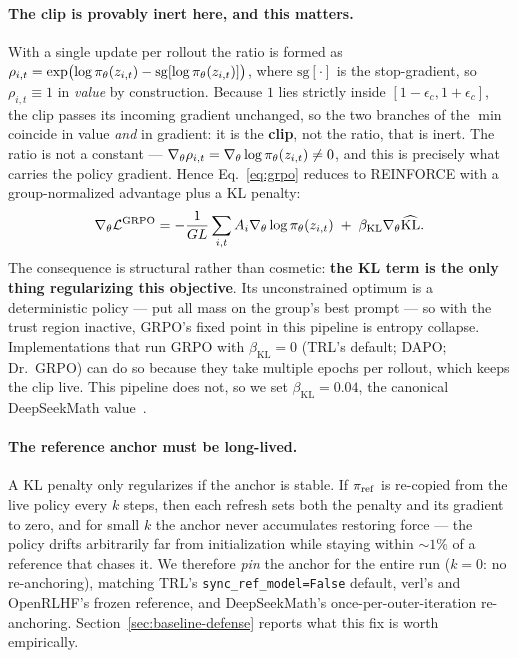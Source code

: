 \paragraph{The clip is provably inert here, and this matters.}
With a single update per rollout the ratio is formed as
$\rho_{i,t} = \exp\bigl(\log \pi_\theta(z_{i,t}) - \mathrm{sg}[\log \pi_\theta(z_{i,t})]\bigr)$,
where $\mathrm{sg}[\cdot]$ is the stop-gradient, so $\rho_{i,t} \equiv 1$ in
\emph{value} by construction. Because $1$ lies strictly inside
$[1-\epsilon_c, 1+\epsilon_c]$, the clip passes its incoming gradient
unchanged, so the two branches of the $\min$ coincide in value \emph{and} in
gradient: it is the \textbf{clip}, not the ratio, that is inert. The ratio is
not a constant --- $\nabla_\theta \rho_{i,t} = \nabla_\theta \log \pi_\theta(z_{i,t})
\neq 0$, and this is precisely what carries the policy gradient. Hence
Eq.~\eqref{eq:grpo} reduces to REINFORCE with a group-normalized advantage plus
a KL penalty:
\begin{equation}
  \nabla_\theta \mathcal{L}^{\mathrm{GRPO}}
  = -\frac{1}{G L}\sum_{i,t} A_i \nabla_\theta \log \pi_\theta(z_{i,t})
    \;+\; \beta_{\mathrm{KL}} \nabla_\theta \widehat{\mathrm{KL}} .
\end{equation}
The consequence is structural rather than cosmetic: \textbf{the KL term is the
only thing regularizing this objective}. Its unconstrained optimum is a
deterministic policy --- put all mass on the group's best prompt --- so with the
trust region inactive, GRPO's fixed point in this pipeline is entropy collapse.
Implementations that run GRPO with $\beta_{\mathrm{KL}} = 0$ (TRL's default;
DAPO; Dr.\ GRPO) can do so because they take multiple epochs per rollout, which
keeps the clip live. This pipeline does not, so we set
$\beta_{\mathrm{KL}} = 0.04$, the canonical DeepSeekMath value~\citep{shao2024deepseekmath}.

\paragraph{The reference anchor must be long-lived.}
A KL penalty only regularizes if the anchor is stable. If $\pi_{\mathrm{ref}}$ is
re-copied from the live policy every $k$ steps, then each refresh sets both the
penalty and its gradient to zero, and for small $k$ the anchor never accumulates
restoring force --- the policy drifts arbitrarily far from initialization while
staying within $\sim\!1\%$ of a reference that chases it. We therefore
\emph{pin} the anchor for the entire run ($k = 0$: no re-anchoring), matching
TRL's \texttt{sync\_ref\_model=False} default, verl's and OpenRLHF's frozen
reference, and DeepSeekMath's once-per-outer-iteration re-anchoring.
Section~\ref{sec:baseline-defense} reports what this fix is worth empirically.

